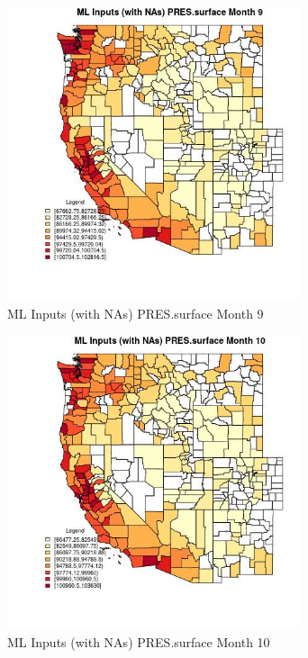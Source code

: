 \begin{figure} 
\centering  
\includegraphics[width=0.77\textwidth]{Code_Outputs/Report_ML_input_PM25_Step4_part_e_de_duplicated_aves_compiled_2019-05-21wNAs_CountyPRESsurfacemedianMonth9.jpg} 
\caption{\label{fig:Report_ML_input_PM25_Step4_part_e_de_duplicated_aves_compiled_2019-05-21wNAsCountyPRESsurfacemedianMonth9}ML Inputs (with NAs) PRES.surface Month 9} 
\end{figure} 
 

\begin{figure} 
\centering  
\includegraphics[width=0.77\textwidth]{Code_Outputs/Report_ML_input_PM25_Step4_part_e_de_duplicated_aves_compiled_2019-05-21wNAs_CountyPRESsurfacemedianMonth10.jpg} 
\caption{\label{fig:Report_ML_input_PM25_Step4_part_e_de_duplicated_aves_compiled_2019-05-21wNAsCountyPRESsurfacemedianMonth10}ML Inputs (with NAs) PRES.surface Month 10} 
\end{figure} 
 

